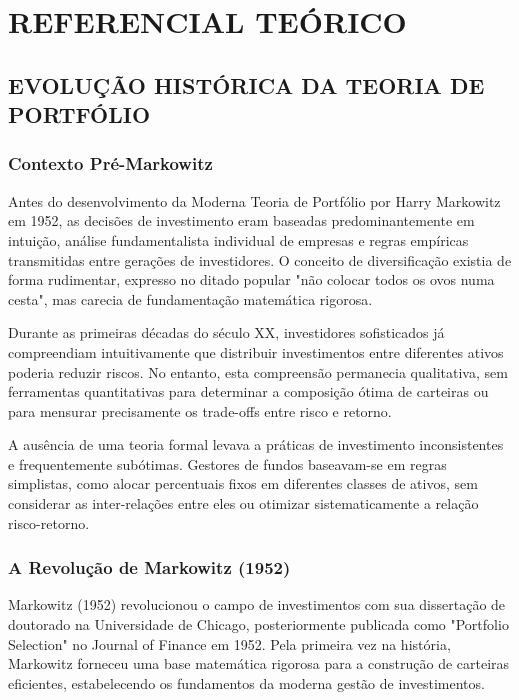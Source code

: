 
\chapter{REFERENCIAL TEÓRICO}

\section{EVOLUÇÃO HISTÓRICA DA TEORIA DE PORTFÓLIO}

\subsection{Contexto Pré-Markowitz}

Antes do desenvolvimento da Moderna Teoria de Portfólio por Harry Markowitz em 1952, as decisões de investimento eram baseadas predominantemente em intuição, análise fundamentalista individual de empresas e regras empíricas transmitidas entre gerações de investidores. O conceito de diversificação existia de forma rudimentar, expresso no ditado popular "não colocar todos os ovos numa cesta", mas carecia de fundamentação matemática rigorosa.

Durante as primeiras décadas do século XX, investidores sofisticados já compreendiam intuitivamente que distribuir investimentos entre diferentes ativos poderia reduzir riscos. No entanto, esta compreensão permanecia qualitativa, sem ferramentas quantitativas para determinar a composição ótima de carteiras ou para mensurar precisamente os trade-offs entre risco e retorno.

A ausência de uma teoria formal levava a práticas de investimento inconsistentes e frequentemente subótimas. Gestores de fundos baseavam-se em regras simplistas, como alocar percentuais fixos em diferentes classes de ativos, sem considerar as inter-relações entre eles ou otimizar sistematicamente a relação risco-retorno.

\subsection{A Revolução de Markowitz (1952)}

Markowitz (1952) revolucionou o campo de investimentos com sua dissertação de doutorado na Universidade de Chicago, posteriormente publicada como "Portfolio Selection" no Journal of Finance em 1952. Pela primeira vez na história, Markowitz forneceu uma base matemática rigorosa para a construção de carteiras eficientes, estabelecendo os fundamentos da moderna gestão de investimentos.

